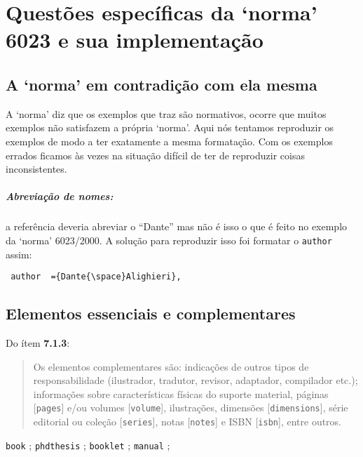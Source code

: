 \documentclass[espacosimples]{abnt}
\begin{document}



\apendice
\chapter{Questões específicas da `norma' 6023 e sua implementação}

\section{A `norma' em contradição com ela mesma}

A `norma' diz que os exemplos que traz são normativos, ocorre
que muitos exemplos não satisfazem a própria `norma'.
Aqui nós tentamos reproduzir os exemplos de modo a ter exatamente
a mesma formatação. Com os exemplos errados ficamos às vezes na
situação difícil de ter de reproduzir coisas inconsistentes.

\paragraph{Abreviação de nomes:} a referência 
deveria abreviar o ``Dante'' mas não é isso o que é feito no
exemplo da `norma' 6023/2000\cite{NBR6023:2000}.
A solução para reproduzir isso foi formatar o {\tt author} assim:
\begin{verbatim}
 author  ={Dante{\space}Alighieri},
\end{verbatim}

\section{Elementos essenciais e complementares}

Do ítem {\bf 7.1.3}\cite{NBR6023:2000}:
\begin{quote}
Os elementos complementares são: indicações de outros tipos de responsabilidade
(ilustrador, tradutor, revisor, adaptador, compilador etc.);
informações sobre características físicas do suporte material, páginas
[{\tt pages}] e/ou
volumes [{\tt volume}], ilustrações,
dimensões [{\tt dimensions}]\cite{7.1.3-1,7.1.3-2},
série editorial ou coleção [{\tt series}], notas [{\tt notes}] e
ISBN [{\tt isbn}]\cite{7.1.3-1,7.1.3-2}, entre outros.
\end{quote}

{\tt book} \cite{7.1.3-1,7.1.3-2,7.1.3-5,7.1.3-6,7.1.3-10};
{\tt phdthesis} \cite{7.1.3-3};
{\tt booklet} \cite{7.1.3-4};
{\tt manual} \cite{7.1.3-7,7.1.3-8,7.1.3-9};
\end{document}

